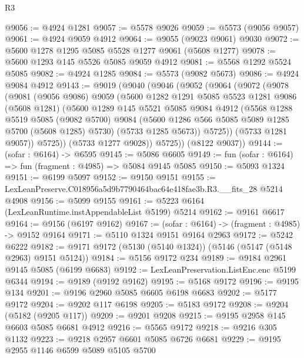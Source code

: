 \begin{lexlean}{R3}
\begin{coremodule}
@9056 := @4924 @1281
@9057 := @5578 @9026
@9059 := @5573 (@9056 @9057)
@9061 := @4924 @9059 @4912
@9064 := @9055 (@9023 @9061) @9030
@9072 := @5600 @1278 @1295 @5085 @5528 @1277 @9061 (@5608 @1277)
@9078 := @5600 @1293 @145 @5526 @5085 @9059 @4912
@9081 := @5568 @1292 @5524 @5085
@9082 := @4924 @1285
@9084 := @5573 (@9082 @5673)
@9086 := @4924 @9084 @4912
@9143 := @9019
    (@9040
      (@9046
        (@9052
          (@9064
            (@9072
              (@9078
                (@9081
                  (@9056 @9086)
                  @9059
                  (@5600
                    @1282
                    @1291
                    @5085
                    @5523
                    @1281
                    @9086
                    (@5608 @1281)
                    (@5600
                      @1289
                      @145
                      @5521
                      @5085
                      @9084
                      @4912
                      (@5568
                        @1288
                        @5519
                        @5085
                        (@9082 @5700)
                        @9084
                        (@5600 @1286 @566 @5085 @5089 @1285 @5700 (@5608 @1285) @5730)
                        (@5733 @1285 @5673))
                      @5725))
                  (@5733 @1281 @9057))
                @5725))
            (@5733 @1277 @9028))
          @5725))
      (@8122 @9037))
@9144 := (sofar : @6164) -> @6595
@9145 := @5086 @6605
@9149 := fun (sofar : @6164) => fun (fragment : @4985) => @5084 @9145 @5085
@9150 := @5093 @1324
@9151 := @6199 @5097
@9152 := @9150 @9151
@9155 := LexLeanPreserve.C018956a5d9b7790464bac64e418fae3b.R3.__fits_28 @5214 @4908
@9156 := @5099 @9155
@9161 := @5223 @6164 (LexLeanRuntime.instAppendableList @5199) @5214
@9162 := @9161 @6617
@9164 := @9156 (@6197 @9162)
@9167 := (sofar : @6164) -> (fragment : @4985) -> @9152 @9164
@9171 := @5110 @1324 @9151 @9164 @2963
@9172 := @5242 @6222
@9182 := @9171 @9172 (@5130 (@5140 @1324)) (@5146 (@5147 (@5148 @2963) @9151 @5124))
@9184 := @5156 @9172 @234
@9189 := @9184 @2961 @9145 @5085 (@6199 @6683)
@9192 := LexLeanPreservation.ListEnc.enc @5199 @6344
@9194 := @9189 (@9192 @9162)
@9195 := @5168 @9172
@9196 := @9195 @134
@9201 := @9196 @2960 @5085 @6605 @6198 @6683
@9202 := @5177 @9172
@9204 := @9202 @117 @6198
@9205 := @5183 @9172
@9208 := @9204 (@5182 (@9205 @117))
@9209 := @9201 @9208
@9215 := @9195 @2958 @145 @6603 @5085 @6681 @4912
@9216 := @5565 @9172
@9218 := @9216 @305 @1132
@9223 := @9218 @2957 @6601 @5085 @6726 @6681
@9229 := @9195 @2955 @1146 @6599 @5089 @5105 @5700

\end{coremodule}
\end{lexlean}
